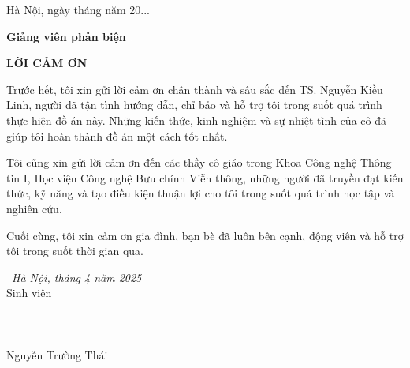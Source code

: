 \documentclass[12pt,a4paper,openany,oneside]{report}
\begin{document}
\begin{flushright}
	Hà Nội, ngày \hspace{0.75cm} tháng \hspace{0.75cm} năm 20...\hspace{0.75cm}
	
	{\textbf{\large{Giảng viên phản biện }}} \hspace{1cm} \textcolor{white}{.}
\end{flushright}


\restoregeometry
\pagestyle{fancy}
\fontsize{13pt}{13pt}\selectfont \baselineskip 0.75cm 

\newpage
\thispagestyle{empty}
\tableofcontents

\newpage
\begin{center}
	\Large{\textbf{LỜI CẢM ƠN}}\\
\end{center}
\vspace{1cm}

Trước hết, tôi xin gửi lời cảm ơn chân thành và sâu sắc đến TS. Nguyễn Kiều Linh, người đã tận tình hướng dẫn, chỉ bảo và hỗ trợ tôi trong suốt quá trình thực hiện đồ án này. Những kiến thức, kinh nghiệm và sự nhiệt tình của cô đã giúp tôi hoàn thành đồ án một cách tốt nhất.

Tôi cũng xin gửi lời cảm ơn đến các thầy cô giáo trong Khoa Công nghệ Thông tin I, Học viện Công nghệ Bưu chính Viễn thông, những người đã truyền đạt kiến thức, kỹ năng và tạo điều kiện thuận lợi cho tôi trong suốt quá trình học tập và nghiên cứu.

Cuối cùng, tôi xin cảm ơn gia đình, bạn bè đã luôn bên cạnh, động viên và hỗ trợ tôi trong suốt thời gian qua.

\phantom{nnnnnnnnnnnnnnnnnnnnnnnnnnnnnnn}\  {\textit{Hà Nội, tháng 4 năm 2025}} \\
\phantom{nnnnnnnnnnnnnnnnnnnnnnnnnnnnnnnnnnnnnnnnn} {Sinh viên}\\
\phantom{nnnnnnnnnnnnnnnnnnnnnnnnnnnnnnnnnn} \\
\phantom{nnnnnnnnnnnnnnnnnnnnnnnnnnnnnnnnnn} \\ 
\phantom{nnnnnnnnnnnnnnnnnnnnnnnnnnnnnnnnnn} \\ 
\phantom{nnnnnnnnnnnnnnnnnnnnnnnnnnnnnnnnnnnnnnn}   {Nguyễn Trường Thái}
\end{document}
